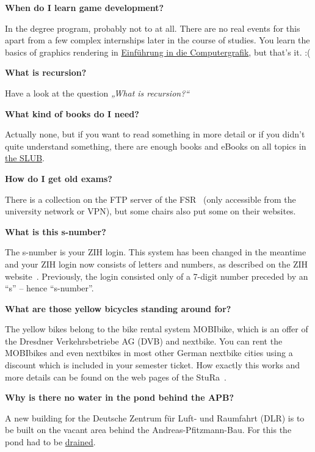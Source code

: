 \textbf{When do I learn game development?}

In the degree program, probably not to at all. 
There are no real events for this apart from a few complex internships later in the course of studies. 
You learn the basics of graphics rendering in \hyperlink{lec:ecg}{Einführung in die Computergrafik}, but that's it. :(

\textbf{What is recursion?}

Have a look at the question \emph{„What is recursion?“}

\textbf{What kind of books do I need?}

Actually none, but if you want to read something in more detail or if you didn't quite understand something, there are enough books and eBooks on all topics in \hyperlink{sec:slub}{the SLUB}.


\textbf{How do I get old exams?}

There is a collection on the FTP server of the FSR~ (only accessible from the university network or VPN), but some chairs also put some on their websites.

\textbf{What is this s-number?}

The s-number is your ZIH login. This system has been changed in the meantime and your ZIH login now consists of letters and numbers, as described on the ZIH website~. Previously, the login consisted only of a 7-digit number preceded by an \enquote{s} -- hence \enquote{s-number}.

\textbf{What are those yellow bicycles standing around for?}

The yellow bikes belong to the bike rental system MOBIbike, which is an offer of the Dresdner Verkehrsbetriebe AG (DVB) and nextbike. You can rent the MOBIbikes and even nextbikes in most other German nextbike cities using a discount which is included in your semester ticket. How exactly this works and more details can be found on the web pages of the StuRa~.

\textbf{Why is there no water in the pond behind the APB?}

A new building for the Deutsche Zentrum für Luft- und Raumfahrt
(DLR) is to be built on the vacant area behind the Andreas-Pfitzmann-Bau.
For this the pond had to be \hyperlink{sec:apb}{drained}.

